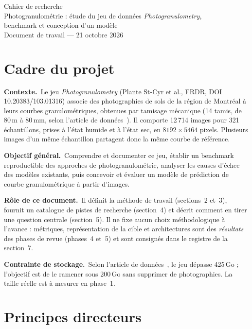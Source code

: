 \documentclass[11pt,a4paper]{article}
\newcommand{\bloc}[1]{\par\medskip\noindent\textbf{#1}\ }
\begin{document}
\begin{center}
{\LARGE Cahier de recherche}\\[8pt]
{\large Photogranulométrie : étude du jeu de données \emph{Photogranulometry},\\
benchmark et conception d'un modèle}\\[20pt]
{\large Document de travail --- 21 octobre 2026}
\end{center}
\vspace{2pt}

\section{Cadre du projet}

\bloc{Contexte.}Le jeu \emph{Photogranulometry} (Plante St-Cyr et al., FRDR, DOI 10.20383/103.01316) associe des photographies de sols de la région de Montréal à leurs courbes granulométriques, obtenues par tamisage mécanique (14 tamis, de 80\,\textmu m à 80\,mm, selon l'article de données~\cite{plante}). Il comporte 12\,714 images pour 321 échantillons, prises à l'état humide et à l'état sec, en $8192\times5464$ pixels. Plusieurs images d'un même échantillon partagent donc la même courbe de référence.

\bloc{Objectif général.}Comprendre et documenter ce jeu, établir un benchmark reproductible des approches de photogranulométrie, analyser les causes d'échec des modèles existants, puis concevoir et évaluer un modèle de prédiction de courbe granulométrique à partir d'images.

\bloc{Rôle de ce document.}Il définit la méthode de travail (sections~2 et~3), fournit un catalogue de pistes de recherche (section~4) et décrit comment en tirer une question centrale (section~5). Il ne fixe aucun choix méthodologique à l'avance : métriques, représentation de la cible et architectures sont des \emph{résultats} des phases de revue (phases~4 et~5) et sont consignés dans le registre de la section~7.

\bloc{Contrainte de stockage.}Selon l'article de données~\cite{plante}, le jeu dépasse 425\,Go ; l'objectif est de le ramener sous 200\,Go sans supprimer de photographies. La taille réelle est à mesurer en phase~1.

\section{Principes directeurs}
\end{document}
